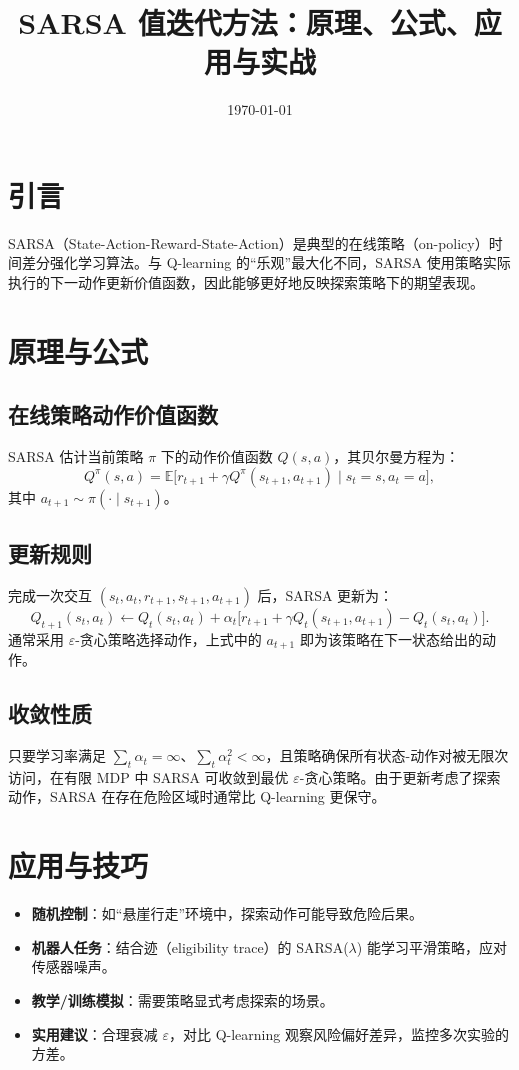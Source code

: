 \documentclass[UTF8,zihao=-4]{ctexart}
\title{SARSA 值迭代方法：原理、公式、应用与实战}
\author{}
\date{\today}
\begin{document}
\maketitle

\section{引言}
SARSA（State-Action-Reward-State-Action）是典型的在线策略（on-policy）时间差分强化学习算法。与 Q-learning 的“乐观”最大化不同，SARSA 使用策略实际执行的下一动作更新价值函数，因此能够更好地反映探索策略下的期望表现。

\section{原理与公式}
\subsection{在线策略动作价值函数}
SARSA 估计当前策略 \(\pi\) 下的动作价值函数 \(Q(s,a)\)，其贝尔曼方程为：
\begin{equation}
Q^{\pi}(s,a) = \mathbb{E}\big[ r_{t+1} + \gamma Q^{\pi}(s_{t+1}, a_{t+1}) \mid s_t = s, a_t = a \big],
\end{equation}
其中 \(a_{t+1} \sim \pi(\cdot \mid s_{t+1})\)。

\subsection{更新规则}
完成一次交互 \((s_t, a_t, r_{t+1}, s_{t+1}, a_{t+1})\) 后，SARSA 更新为：
\begin{equation}
Q_{t+1}(s_t, a_t) \leftarrow Q_t(s_t, a_t) + \alpha_t \Big[ r_{t+1} + \gamma Q_t(s_{t+1}, a_{t+1}) - Q_t(s_t, a_t) \Big].
\end{equation}
通常采用 \(\varepsilon\)-贪心策略选择动作，上式中的 \(a_{t+1}\) 即为该策略在下一状态给出的动作。

\subsection{收敛性质}
只要学习率满足 \(\sum_t \alpha_t = \infty\)、\(\sum_t \alpha_t^2 < \infty\)，且策略确保所有状态-动作对被无限次访问，在有限 MDP 中 SARSA 可收敛到最优 \(\varepsilon\)-贪心策略。由于更新考虑了探索动作，SARSA 在存在危险区域时通常比 Q-learning 更保守。

\section{应用与技巧}
\begin{itemize}
  \item \textbf{随机控制}：如“悬崖行走”环境中，探索动作可能导致危险后果。
  \item \textbf{机器人任务}：结合迹（eligibility trace）的 SARSA(\(\lambda\)) 能学习平滑策略，应对传感器噪声。
  \item \textbf{教学/训练模拟}：需要策略显式考虑探索的场景。
  \item \textbf{实用建议}：合理衰减 \(\varepsilon\)，对比 Q-learning 观察风险偏好差异，监控多次实验的方差。
\end{itemize}
\end{document}
